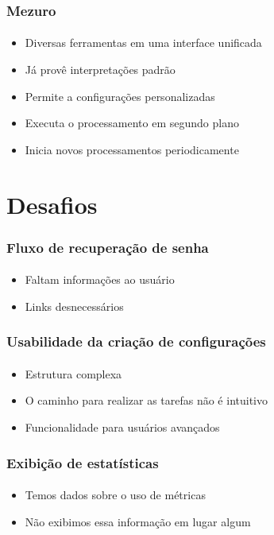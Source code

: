 \documentclass{beamer}
\begin{document}
\begin{frame}
  \frametitle{Mezuro}
  \framesubtitle{}

  \begin{itemize}
    \item Diversas ferramentas em uma interface unificada
    \vspace{.25cm}
    \item Já provê interpretações padrão
    \vspace{.25cm}
    \item Permite a configurações personalizadas
    \vspace{.25cm}
    \item Executa o processamento em segundo plano
    \vspace{.25cm}
    \item Inicia novos processamentos periodicamente
  \end{itemize}
\end{frame}

\section{Desafios}
\begin{frame}
  \frametitle{Fluxo de recuperação de senha}
  \framesubtitle{}

  \begin{itemize}
    \item Faltam informações ao usuário
    \vspace{.5cm}
    \item Links desnecessários
  \end{itemize}
\end{frame}

\begin{frame}
  \frametitle{Usabilidade da criação de configurações}
  \framesubtitle{}

  \begin{itemize}
    \item Estrutura complexa
    \vspace{.5cm}
    \item O caminho para realizar as tarefas não é intuitivo
    \vspace{.5cm}
    \item Funcionalidade para usuários avançados
  \end{itemize}
\end{frame}

\begin{frame}
  \frametitle{Exibição de estatísticas}
  \framesubtitle{}

  \begin{itemize}
    \item Temos dados sobre o uso de métricas
    \vspace{.5cm}
    \item Não exibimos essa informação em lugar algum
  \end{itemize}
\end{frame}
\end{document}

